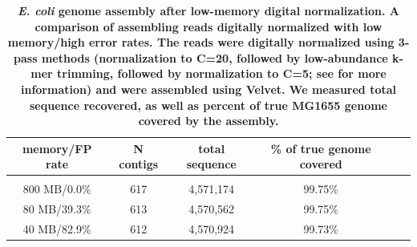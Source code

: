 \documentclass[10pt]{article}
\begin{document}

\begin{table}[!ht]
\caption{
\bf{{\em E. coli} genome assembly after low-memory digital normalization.
  A comparison of assembling reads digitally normalized with low memory/high
  error rates.  The reads were digitally normalized using 3-pass methods  (normalization to C=20, followed by
  low-abundance k-mer trimming, followed by normalization to C=5; see
  \cite{Brown2012} for more information) and were assembled using Velvet.
  We measured total sequence recovered,
  as well as percent of true MG1655 genome covered by the assembly.}}
\begin{tabular}{ | c | c | c | c | c | c |}
memory/FP rate & N contigs & total sequence & \% of true genome covered \\
\hline \\
      800 MB/0.0\% & 617 & 4,571,174 & 99.75\% \\
      80 MB/39.3\% & 613 & 4,570,562 & 99.75\% \\
      40 MB/82.9\% & 612 & 4,570,924 & 99.73\% \\
\end{tabular}
\begin{flushleft}
\end{flushleft}
\label{table:assembly}
\end{table}

\end{document}
